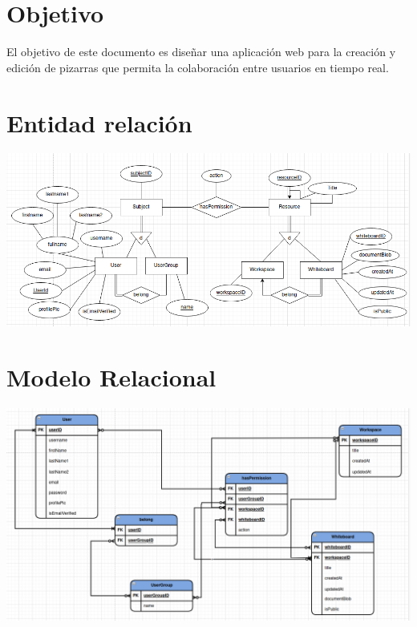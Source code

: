\documentclass[a4paper, oneside, final]{scrartcl}
\begin{document}


\section{Objetivo}

El objetivo de este documento es diseñar una aplicación web para la creación y edición de pizarras que permita la colaboración entre usuarios en tiempo real.


\section{Entidad relación}

\includegraphics[width=\textwidth]{images/EntidadRelacion.png}

\section{Modelo Relacional}
\includegraphics[width=\textwidth]{images/Relacional.png}
\end{document}
